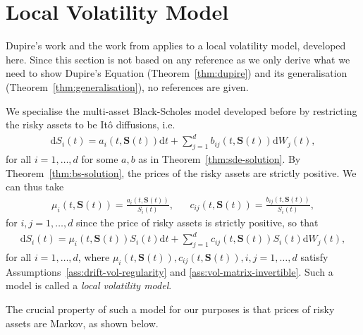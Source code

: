 \documentclass[english]{article}
\numberwithin{equation}{section}
\numberwithin{figure}{section}
\theoremstyle{bolddescit}
\theoremstyle{definition}
\theoremstyle{definition}
\theoremstyle{plain}
\theoremstyle{plain}
\theoremstyle{bolddesc}
\theoremstyle{plain}
\theoremstyle{remark}
\begin{document}
\section{Local Volatility Model}\label{sec:local-vol}

Dupire's work and the work from \textcite{pablo_amster_towards_2009} applies to a local volatility model, developed here. Since this section is not based on any reference as we only derive what we need to show Dupire's Equation (Theorem~\ref{thm:dupire}) and its generalisation (Theorem~\ref{thm:generalisation}), no references are given.

We specialise the multi-asset Black-Scholes model developed before by restricting the risky assets to be It\^o diffusions, i.e.
\begin{align*}
  \mathrm{d}S_i(t) = a_i(t,\mathbf{S}(t)) \mathrm{d}t + \sum_{j=1}^{d} b_{ij}(t,\mathbf{S}(t)) \mathrm{d}W_j(t),
\end{align*}
for all $i=1,\ldots,d$ for some $a,b$ as in Theorem~\ref{thm:sde-solution}. By Theorem~\ref{thm:bs-solution}, the prices of the risky assets are strictly positive. We can thus take
\begin{align*}
  \mu_i(t,\mathbf{S}(t)) = \frac{a_i(t, \mathbf{S}(t))}{S_i(t)},
  && c_{ij}(t,\mathbf{S}(t)) = \frac{b_{ij}(t, \mathbf{S}(t))}{S_i(t)},
\end{align*}
for $i,j=1,\ldots,d$ since the price of risky assets is strictly positive, so that
\begin{align}\label{eq:local-dynamics}
  \mathrm{d}S_i(t) = \mu_i(t,\mathbf{S}(t)) S_i(t) \mathrm{d}t + \sum_{j=1}^{d} c_{ij}(t,\mathbf{S}(t)) S_i(t) \mathrm{d}W_j(t),
\end{align}
for all $i=1,\ldots,d$, where $\mu_i(t,\mathbf{S}(t)), c_{ij}(t,\mathbf{S}(t)), i,j=1,\ldots,d$ satisfy Assumptions~\ref{ass:drift-vol-regularity} and \ref{ass:vol-matrix-invertible}. Such a model is called a \textit{local volatility model}.

The crucial property of such a model for our purposes is that prices of risky assets are Markov, as shown below.
\end{document}
